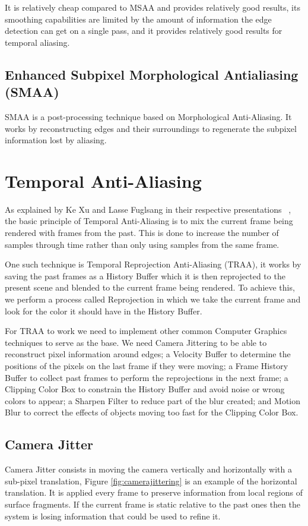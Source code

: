 \documentclass{cslthse-msc}
\begin{document}
It is relatively cheap compared to MSAA and provides relatively good results, its smoothing capabilities are limited by the amount of information the edge detection can get on a single pass, and it provides relatively good results for temporal aliasing.

\subsection{Enhanced Subpixel Morphological Antialiasing (SMAA)}
SMAA is a post-processing technique based on Morphological Anti-Aliasing. It works by reconstructing edges and their surroundings to regenerate the subpixel information lost by aliasing. \cite{Jimenez2012}

\section{Temporal Anti-Aliasing}
As explained by Ke Xu and Lasse Fuglsang in their respective presentations ~\cite{XU2016,Fuglsand2016}, the basic principle of Temporal Anti-Aliasing is to mix the current frame being rendered with frames from the past. This is done to increase the number of samples through time rather than only using samples from the same frame. 

One such technique is Temporal Reprojection Anti-Aliasing (TRAA), it works by saving the past frames as a History Buffer which it is then reprojected to the present scene and blended to the current frame being rendered.  To achieve this, we perform a process called Reprojection in which we take the current frame and look for the color it should have in the History Buffer.

For TRAA to work we need to implement other common Computer Graphics techniques to serve as the base. We need Camera Jittering to be able to reconstruct pixel information around edges; a Velocity Buffer to determine the positions of the pixels on the last frame if they were moving; a Frame History Buffer to collect past frames to perform the reprojections in the next frame; a Clipping Color Box to constrain the History Buffer and avoid noise or wrong colors to appear; a Sharpen Filter to reduce part of the blur created; and Motion Blur to correct the effects of objects moving too fast for the Clipping Color Box.

\subsection{Camera Jitter}
Camera Jitter consists in moving the camera vertically and horizontally with a sub-pixel translation, Figure \ref{fig:camerajittering} is an example of the horizontal translation. It is applied every frame to preserve information from local regions of surface fragments. If the current frame is static relative to the past ones then the system is losing information that could be used to refine it. ~\cite{Fuglsand2016,XU2016}
\end{document}
